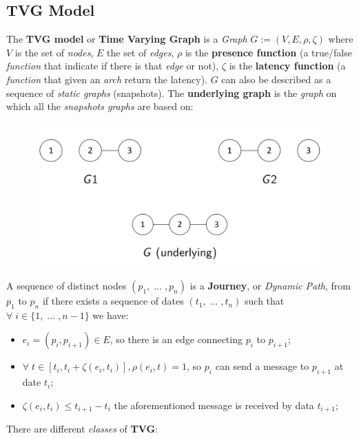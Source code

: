 \documentclass{article}
\begin{document}
\subsection{TVG Model}
The \textbf{TVG model} or \textbf{Time Varying Graph} is a \emph{Graph} $G := (V,E,\rho,\zeta)$ where $V$ is the set of \emph{nodes}, $E$ the set of \emph{edges}, $\rho$ is the \textbf{presence function} (a true/false \emph{function} that indicate if there is that \emph{edge} or not), $\zeta$ is the \textbf{latency function} (a \emph{function} that given an \emph{arch} return the latency). $G$ can also be described as a sequence of \emph{static graphs} (snapshots). The \textbf{underlying graph} is the \emph{graph} on which all the \emph{snapshots graphs} are based on:  
\begin{figure}[H]
  \centering
  \includegraphics[scale=0.5]{cattura98.png}
\end{figure}
A sequence of distinct nodes $(p_1,\;...\;,p_n)$ is a \textbf{Journey}, or \emph{Dynamic Path}, from $p_1$ to $p_n$ if there exists a sequence of dates $(t_1,\;...\;,t_n)$ such that $\forall \;i \in \{1,\;...\;,n-1\}$ we have: 
\begin{itemize}
\item $e_i=(p_i,p_{i+1}) \in E$, so there is an edge connecting $p_i$ to $p_{i+1}$;
\item $\forall \; t \in \left [t_i, t_i + \zeta(e_i,t_i) \right ], \rho(e_i,t) =1$, so $p_i$ can send a message to $p_{i+1}$ at date $t_i$;
\item $\zeta(e_i,t_i) \leq t_{i+1} - t_i$ the aforementioned message is received by data $t_{i+1}$;
\end{itemize}
There are different \emph{classes} of \textbf{TVG}: 
\end{document}

